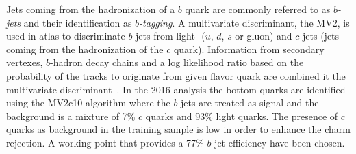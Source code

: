 Jets coming from the hadronization of a $b$ quark are commonly referred to as
\emph{$b$-jets} and their identification as \emph{$b$-tagging}. A multivariate
discriminant, the MV2, is used in \gls{atlas} to discriminate $b$-jets from
light- ($u$, $d$, $s$ or gluon) and $c$-jets (jets coming from the hadronization
of the $c$ quark). Information from secondary vertexes, $b$-hadron decay chains
and a log likelihood ratio based on the probability of the tracks to originate
from given flavor quark are combined it the multivariate
discriminant~\cite{BTagging}. In the 2016 analysis the bottom quarks are
identified using the MV2c10 algorithm where the $b$-jets are treated as signal
and the background is a mixture of 7\% $c$ quarks and 93\% light quarks. The
presence of $c$ quarks as background in the training sample is low in order to
enhance the charm rejection. A working point that provides a 77\% $b$-jet
efficiency have been chosen.
